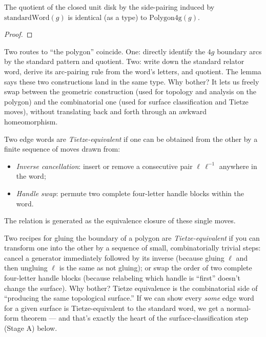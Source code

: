 \begin{lemma}
\label{lem:polygon4g-eq-standard-word-quotient}
The quotient of the closed unit disk by the side-pairing induced by
\(\mathrm{standardWord}(g)\) is identical (as a type) to
\(\mathrm{Polygon4g}(g)\).
\leanok
\end{lemma}
\begin{proof}\leanok\end{proof}

\begin{layman}
Two routes to ``the polygon'' coincide. One: directly identify the
\(4g\) boundary arcs by the standard pattern and quotient. Two:
write down the standard relator word, derive its arc-pairing rule
from the word's letters, and quotient. The lemma says these two
constructions land in the same type. Why bother? It lets us freely
swap between the geometric construction (used for topology and
analysis on the polygon) and the combinatorial one (used for surface
classification and Tietze moves), without translating back and forth
through an awkward homeomorphism.
\end{layman}

\begin{definition}
\label{def:tietze-equivalence}
Two edge words are \emph{Tietze-equivalent} if one can be obtained
from the other by a finite sequence of moves drawn from:
\begin{itemize}
  \item \emph{Inverse cancellation}: insert or remove a consecutive
    pair \(\ell\,\ell^{-1}\) anywhere in the word;
  \item \emph{Handle swap}: permute two complete four-letter handle
    blocks within the word.
\end{itemize}
The relation is generated as the equivalence closure of these single
moves.
\leanok
\end{definition}

\begin{layman}
Two recipes for gluing the boundary of a polygon are
\emph{Tietze-equivalent} if you can transform one into the other by
a sequence of small, combinatorially trivial steps: cancel a
generator immediately followed by its inverse (because gluing
\(\ell\) and then ungluing \(\ell\) is the same as not gluing); or
swap the order of two complete four-letter handle blocks (because
relabeling which handle is ``first'' doesn't change the surface).
Why bother? Tietze equivalence is the combinatorial side of
``producing the same topological surface.'' If we can show every
\emph{some} edge word for a given surface is Tietze-equivalent to the
standard word, we get a normal-form theorem — and that's exactly the
heart of the surface-classification step (Stage A) below.
\end{layman}

